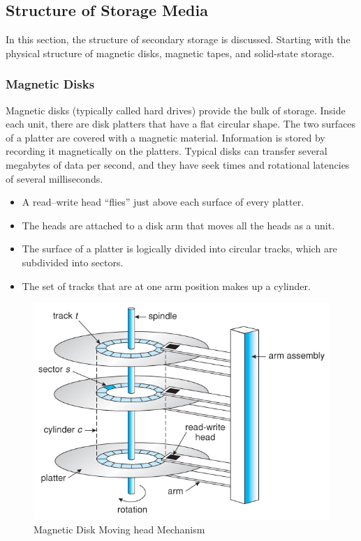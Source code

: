 \subsection{Structure of Storage Media}\label{subsec:Structure_Storage_Media}
In this section, the structure of secondary storage is discussed.
Starting with the physical structure of magnetic disks, magnetic tapes, and solid-state storage.

\subsubsection{Magnetic Disks}\label{subsubsec:Magnetic_Disks}
Magnetic disks (typically called hard drives) provide the bulk of storage.
Inside each unit, there are disk platters that have a flat circular shape.
The two surfaces of a platter are covered with a magnetic material.
Information is stored by recording it magnetically on the platters.
Typical disks can transfer several megabytes of data per second, and they have seek times and rotational latencies of several milliseconds.

\begin{itemize}[noitemsep]
\item A read–write head ``flies'' just above each surface of every platter.
\item The heads are attached to a disk arm that moves all the heads as a unit.
\item The surface of a platter is logically divided into circular tracks, which are subdivided into sectors.
\item The set of tracks that are at one arm position makes up a cylinder.
\end{itemize}

\begin{figure}[h!tbp]
  \centering
  \includegraphics[scale=0.8]{./Drawings/EDAF35-Operating_Systems/Magnetic_Disk_Mechanism.jpg}
  \caption{Magnetic Disk Moving head Mechanism}
  \label{fig:HDD_Mechanism}
\end{figure}

